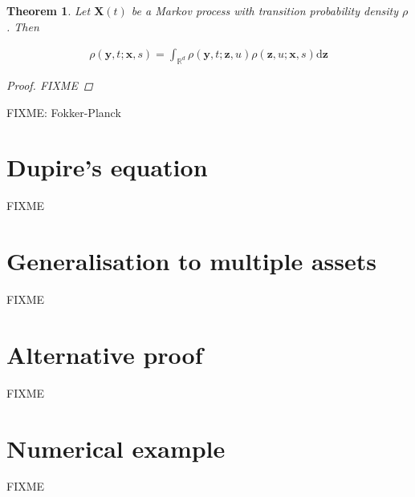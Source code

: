 \documentclass[a4paper]{article}
\newtheorem{theorem}[definition]{Theorem}
\begin{document}
\begin{theorem}\label{thm:chapman-kolmogorov}
  Let $\mathbf{X}(t)$ be a Markov process with transition probability density $\rho$. Then

  \begin{align*}
    \rho(\mathbf{y}, t; \mathbf{x}, s) = \int_{\mathbb{R}^d} \rho(\mathbf{y}, t; \mathbf{z}, u) \rho(\mathbf{z}, u; \mathbf{x}, s) \mathrm{d}\mathbf{z}
  \end{align*}

  \begin{proof}
    FIXME
  \end{proof}
\end{theorem}

FIXME: Fokker-Planck

\section{Dupire's equation}


FIXME

\section{Generalisation to multiple assets}


FIXME

\section{Alternative proof}


FIXME

\section{Numerical example}


FIXME

\pagebreak
\printbibliography
\end{document}

